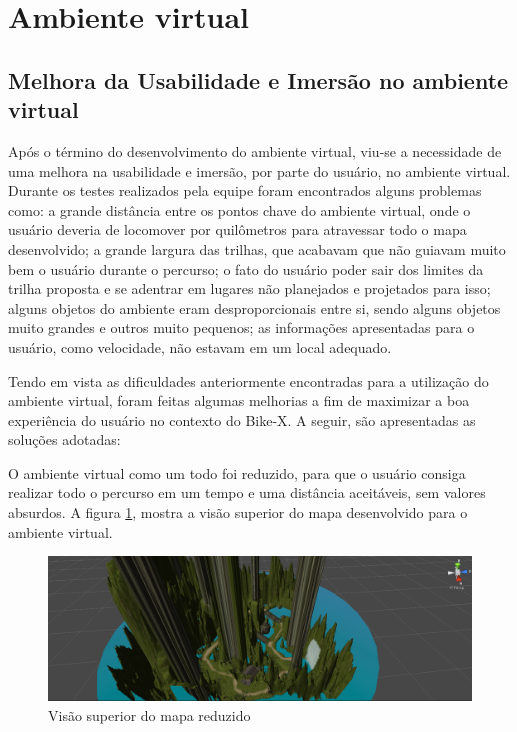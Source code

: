 \section {Ambiente virtual}

\subsection{ Melhora da Usabilidade e Imersão no ambiente virtual }

Após o término do desenvolvimento do ambiente virtual, viu-se a necessidade de uma melhora na usabilidade e imersão, por parte do usuário, no ambiente virtual. Durante os testes realizados pela equipe foram encontrados alguns problemas como: a grande distância entre os pontos chave do ambiente virtual, onde o usuário deveria de locomover por quilômetros para atravessar todo o mapa desenvolvido; a grande largura das trilhas, que acabavam que não guiavam muito bem o usuário durante o percurso; o fato do usuário poder sair dos limites da trilha proposta e se adentrar em lugares não planejados e projetados para isso; alguns objetos do ambiente eram desproporcionais entre si, sendo alguns objetos muito grandes e outros muito pequenos; as informações apresentadas para o usuário, como velocidade, não estavam em um local adequado.

Tendo em vista as dificuldades anteriormente encontradas para a utilização do ambiente virtual, foram feitas algumas melhorias a fim de maximizar a boa experiência do usuário no contexto do Bike-X. A seguir, são apresentadas as soluções adotadas:

O ambiente virtual como um todo foi reduzido, para que o usuário consiga realizar todo o percurso em um tempo e uma distância aceitáveis, sem valores absurdos. A figura \ref{fig:mapaReduzido}, mostra a visão superior do mapa desenvolvido para o ambiente virtual.

\begin{figure}[h]
  \centering
  \includegraphics[width=1.0\textwidth]{figuras/mapaReduzido}
  \caption{Visão superior do mapa reduzido}
  \label{fig:mapaReduzido}
\end{figure}

